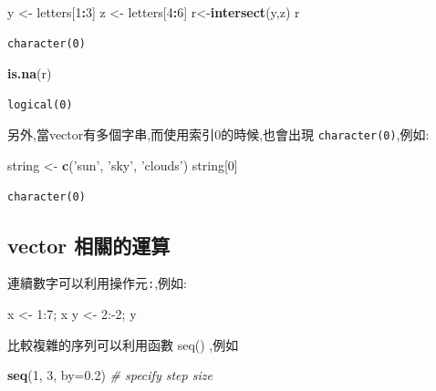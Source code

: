 \documentclass[]{book}
\newenvironment{Shaded}{\begin{snugshade}}{\end{snugshade}}
\newcommand{\CommentTok}[1]{\textcolor[rgb]{0.56,0.35,0.01}{\textit{#1}}}
\newcommand{\DataTypeTok}[1]{\textcolor[rgb]{0.13,0.29,0.53}{#1}}
\newcommand{\DecValTok}[1]{\textcolor[rgb]{0.00,0.00,0.81}{#1}}
\newcommand{\FloatTok}[1]{\textcolor[rgb]{0.00,0.00,0.81}{#1}}
\newcommand{\KeywordTok}[1]{\textcolor[rgb]{0.13,0.29,0.53}{\textbf{#1}}}
\newcommand{\NormalTok}[1]{#1}
\newcommand{\OperatorTok}[1]{\textcolor[rgb]{0.81,0.36,0.00}{\textbf{#1}}}
\newcommand{\StringTok}[1]{\textcolor[rgb]{0.31,0.60,0.02}{#1}}
\theoremstyle{definition}
\theoremstyle{definition}
\theoremstyle{definition}
\theoremstyle{remark}
\begin{document}
\begin{Shaded}
\begin{Highlighting}[]
\NormalTok{y <-}\StringTok{ }\NormalTok{letters[}\DecValTok{1}\OperatorTok{:}\DecValTok{3}\NormalTok{] }
\NormalTok{z <-}\StringTok{ }\NormalTok{letters[}\DecValTok{4}\OperatorTok{:}\DecValTok{6}\NormalTok{] }
\NormalTok{r<-}\KeywordTok{intersect}\NormalTok{(y,z) }
\NormalTok{r}
\end{Highlighting}
\end{Shaded}

\begin{verbatim}
character(0)
\end{verbatim}

\begin{Shaded}
\begin{Highlighting}[]
\KeywordTok{is.na}\NormalTok{(r)}
\end{Highlighting}
\end{Shaded}

\begin{verbatim}
logical(0)
\end{verbatim}

另外,當vector有多個字串,而使用索引0的時候,也會出現
\texttt{character(0)},例如:

\begin{Shaded}
\begin{Highlighting}[]
\NormalTok{string <-}\StringTok{ }\KeywordTok{c}\NormalTok{(}\StringTok{'sun'}\NormalTok{, }\StringTok{'sky'}\NormalTok{, }\StringTok{'clouds'}\NormalTok{)}
\NormalTok{string[}\DecValTok{0}\NormalTok{]}
\end{Highlighting}
\end{Shaded}

\begin{verbatim}
character(0)
\end{verbatim}

\hypertarget{vector-}{%
\subsection{vector 相關的運算}\label{vector-}}

連續數字可以利用操作元\texttt{:},例如:

x \textless{}- 1:7; x y \textless{}- 2:-2; y

比較複雜的序列可以利用函數 seq() ,例如

\begin{Shaded}
\begin{Highlighting}[]
\KeywordTok{seq}\NormalTok{(}\DecValTok{1}\NormalTok{, }\DecValTok{3}\NormalTok{, }\DataTypeTok{by=}\FloatTok{0.2}\NormalTok{)          }\CommentTok{# specify step size}
\end{Highlighting}
\end{Shaded}
\end{document}
